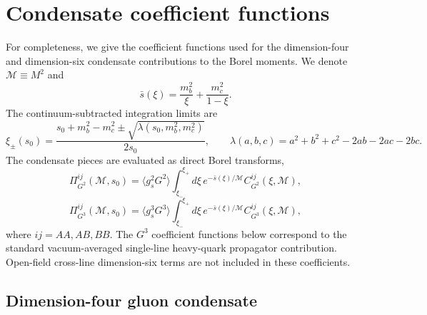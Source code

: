 
\section{Condensate coefficient functions}
\label{app:condensate-coefficients}

For completeness, we give the coefficient functions used for the dimension-four
and dimension-six condensate contributions to the Borel moments.  We denote
\(\mathcal M\equiv M^2\) and
\begin{equation}
  \bar s(\xi)=\frac{m_b^2}{\xi}+\frac{m_c^2}{1-\xi}.
\end{equation}
The continuum-subtracted integration limits are
\begin{equation}
  \xi_\pm(s_0)=
  \frac{s_0+m_b^2-m_c^2\pm
  \sqrt{\lambda(s_0,m_b^2,m_c^2)}}{2s_0},
  \qquad
  \lambda(a,b,c)=a^2+b^2+c^2-2ab-2ac-2bc .
\end{equation}
The condensate pieces are evaluated as direct Borel transforms,
\begin{equation}
  \Pi^{ij}_{G^2}(\mathcal M,s_0)
  =
  \langle g_s^2G^2\rangle
  \int_{\xi_-}^{\xi_+}d\xi\,
  e^{-\bar s(\xi)/\mathcal M}
  C^{ij}_{G^2}(\xi,\mathcal M),
\end{equation}
\begin{equation}
  \Pi^{ij}_{G^3}(\mathcal M,s_0)
  =
  \langle g_s^3G^3\rangle
  \int_{\xi_-}^{\xi_+}d\xi\,
  e^{-\bar s(\xi)/\mathcal M}
  C^{ij}_{G^3}(\xi,\mathcal M),
\end{equation}
where \(ij=AA,AB,BB\).  The \(G^3\) coefficient functions below correspond to
the standard vacuum-averaged single-line heavy-quark propagator contribution.
Open-field cross-line dimension-six terms are not included in these
coefficients.

\subsection{Dimension-four gluon condensate}


